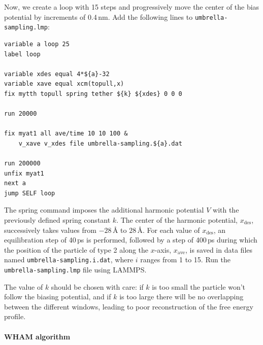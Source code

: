 \documentclass[9pt,tutorial]{livecoms}
\newcommand{\lmpcmd}[1]{\hspace{0pt}\colorbox{listing}{\textcolor{command}{\small{#1}}}\hspace{0pt}} %
\newcommand{\flecmd}[1]{\textcolor{command}{\texttt{#1}}} %
\begin{document}
Now, we create a loop with 15 steps and progressively move the center of the
bias potential by increments of 0.4\,nm.  Add the following lines to \flecmd{umbrella-sampling.lmp}:
\begin{lstlisting}
variable a loop 25
label loop

variable xdes equal 4*${a}-32
variable xave equal xcm(topull,x)
fix mytth topull spring tether ${k} ${xdes} 0 0 0

run 20000

fix myat1 all ave/time 10 10 100 &
    v_xave v_xdes file umbrella-sampling.${a}.dat

run 200000
unfix myat1
next a
jump SELF loop
\end{lstlisting}
The \lmpcmd{spring} command imposes the additional harmonic potential $V$ with
the previously defined spring constant $k$.  The center of the harmonic
potential, $x_\text{des}$, successively takes values
from $-28\,\text{\AA}$ to $28\,\text{\AA}$.  For each value of $x_\text{des}$,
an equilibration step of 40\,ps is performed, followed by a step
of 400\,ps during which the position of the particle of
type 2 along the $x$-axis, $x_\text{ave}$, is saved in data files named \flecmd{umbrella-sampling.i.dat},
where $i$ ranges from 1 to 15.  Run the \flecmd{umbrella-sampling.lmp} file using LAMMPS.

\begin{note}
The value of $k$ should be chosen with care:
if $k$ is too small the particle won't follow the biasing potential,
and if $k$ is too large there will be no overlapping between
the different windows, leading to poor reconstruction of the free energy profile.
\end{note}

\paragraph{WHAM algorithm}
\end{document}
